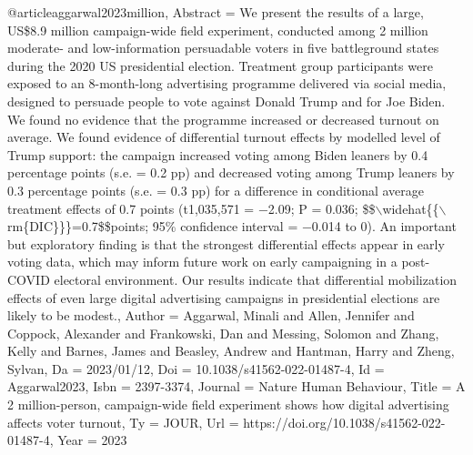 @article{aggarwal2023million,
    Abstract = {We present the results of a large, US{\$}8.9 million campaign-wide field experiment, conducted among 2 million moderate- and low-information persuadable voters in five battleground states during the 2020 US presidential election. Treatment group participants were exposed to an 8-month-long advertising programme delivered via social media, designed to persuade people to vote against Donald Trump and for Joe Biden. We found no evidence that the programme increased or decreased turnout on average. We found evidence of differential turnout effects by modelled level of Trump support: the campaign increased voting among Biden leaners by 0.4 percentage points (s.e. = 0.2 pp) and decreased voting among Trump leaners by 0.3 percentage points (s.e. = 0.3 pp) for a difference in conditional average treatment effects of 0.7 points (t1,035,571 = −2.09; P = 0.036; {\$}{\$}{$\backslash$}widehat{\{}{\{}{$\backslash$}rm{\{}DIC{\}}{\}}{\}}=0.7{\$}{\$}points; 95{\%} confidence interval = −0.014 to 0). An important but exploratory finding is that the strongest differential effects appear in early voting data, which may inform future work on early campaigning in a post-COVID electoral environment. Our results indicate that differential mobilization effects of even large digital advertising campaigns in presidential elections are likely to be modest.},
    Author = {Aggarwal, Minali and Allen, Jennifer and Coppock, Alexander and Frankowski, Dan and Messing, Solomon and Zhang, Kelly and Barnes, James and Beasley, Andrew and Hantman, Harry and Zheng, Sylvan},
    Da = {2023/01/12},
    Doi = {10.1038/s41562-022-01487-4},
    Id = {Aggarwal2023},
    Isbn = {2397-3374},
    Journal = {Nature Human Behaviour},
    Title = {A 2 million-person, campaign-wide field experiment shows how digital advertising affects voter turnout},
    Ty = {JOUR},
    Url = {https://doi.org/10.1038/s41562-022-01487-4},
    Year = {2023}
    }

